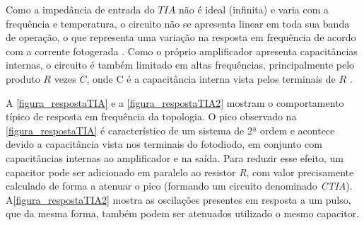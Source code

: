 Como a imped\^ancia de entrada do $TIA$ não \'e ideal (infinita) e varia com a frequ\^encia e temperatura, o circuito não se apresenta linear em toda sua banda de operação, o que representa uma variação na resposta em frequ\^encia de acordo com a corrente fotogerada \cite{hamamatsu}.
Como o pr\'oprio amplificador apresenta capacit\^ancias internas, o circuito \'e tamb\'em limitado em altas frequ\^encias, principalmente pelo produto $R$ vezes $C$, onde C \'e a capacit\^ancia interna vista pelos terminais de $R$ \cite{hamamatsu}.

A \autoref{figura_respostaTIA} e a \autoref{figura_respostaTIA2} mostram o comportamento t\'ipico de resposta em frequ\^encia da topologia. O pico observado na \autoref{figura_respostaTIA} é característico de um sistema de 2ª ordem e acontece devido a capacitância vista nos terminais do fotodiodo, em conjunto com capacitâncias internas ao amplificador e na saída. Para reduzir esse efeito, um capacitor pode ser adicionado em paralelo ao resistor \textit{R}, com valor precisamente calculado de forma a atenuar o pico (formando um circuito denominado \textit{CTIA}). A\autoref{figura_respostaTIA2} mostra as oscilações presentes em resposta a um pulso, que da mesma forma, também podem ser atenuados utilizado o mesmo capacitor.

